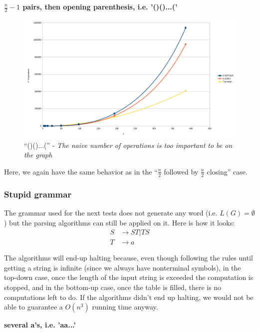\documentclass[]{article}
\begin{document}
\newpage
\textbf{$\frac n2-1$ pairs, then opening parenthesis, i.e. '()()...('}\\
\begin{figure}[h]
  \label{fig:plr}
  \includegraphics[width=\textwidth]{paren/complexity_paren_left_right_opening}
  \caption{``()()...('' - \textit{The naive number of operations is too important to be on
      the graph}}
\end{figure}
\begin{multicols}{2}

Here, we again have the same behavior as in the ``$\frac n2$ followed by $\frac n2$
closing'' case.

\newpage
\subsubsection{Stupid grammar}
The grammar used for the next tests does not generate any word (i.e. $L(G)=\emptyset$) but the parsing algorithms can still be applied on it. Here is how it looks:
\begin{align*}
  S&\rightarrow ST|TS\\
  T&\rightarrow a
\end{align*}

The algorithms will end-up halting because, even though following the rules until
getting a string is infinite (since we always have nonterminal symbols), in the
top-down case, once
the length of the input string is exceeded the computation is stopped, and in
the bottom-up case, once the table is filled, there is no computations left to
do. If the algorithms didn't end up halting, we would not be able to guarantee a
$O(n^3)$ running time anyway.

\end{multicols}
\textbf{several a's, i.e. 'aa...'}\\
\end{document}
